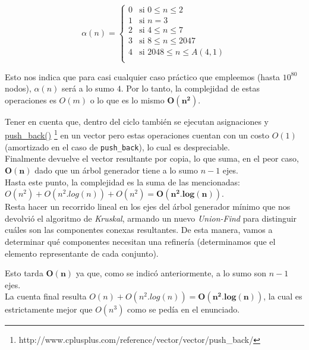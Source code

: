 	\begin{equation*}
	\alpha(n) = 
	\begin{cases} 
		0  & \mbox{si } 0 \leq n \leq 2 \\
		1  & \mbox{si } n = 3 \\
		2  & \mbox{si } 4 \leq n \leq 7 \\
		3  & \mbox{si } 8 \leq n \leq 2047 \\
		4  & \mbox{si } 2048 \leq n \leq A(4,1) \\
	\end{cases}
	\end{equation*}

	Esto nos indica que para casi cualquier caso pr\'actico que empleemos (hasta $10^{80}$ nodos), $\alpha(n)$ ser\'a a lo sumo $4$. Por lo tanto, la complejidad de estas operaciones es $O(m)$ o lo que es lo mismo $\mathbf{O(n^2)}$.
	
	Tener en cuenta que, dentro del ciclo tambi\'en se ejecutan asignaciones y \href{http://www.cplusplus.com/reference/vector/vector/push_back/}{push\_back()} \footnote{http://www.cplusplus.com/reference/vector/vector/push_back/} en un vector pero estas operaciones cuentan con un costo $O(1)$ (amortizado en el caso de \texttt{push\_back}), lo cual es despreciable.\\

	Finalmente devuelve el vector resultante por copia, lo que suma, en el peor caso, $\mathbf{O(n)}$ dado que un \'arbol generador tiene a lo sumo $n-1$ ejes.\\

	Hasta este punto, la complejidad es la suma de las mencionadas:  $ O(n^2) + O(n^2.log(n)) + O(n^2) = \mathbf{O(n^2.log(n))}$.\\

	Resta hacer un recorrido lineal en los ejes del \'arbol generador m\'inimo que nos devolvi\'o el algoritmo de \textit{Kruskal}, armando un nuevo \textit{Union-Find} para distinguir cu\'ales son las componentes conexas resultantes. De esta manera, vamos a determinar 	qu\'e componentes necesitan una refiner\'ia (determinamos que el elemento representante de cada conjunto).
		
	 Esto tarda $\mathbf{O(n)}$ ya que, como se indic\'o anteriormente, a lo sumo son $n-1$ ejes.\\

	La cuenta final resulta $O(n) + O(n^2.log(n)) = \mathbf{O(n^2.log(n))}$, la cual es estrictamente mejor que $O(n^3)$ como se ped\'ia en el enunciado.


